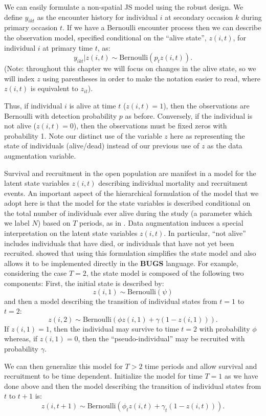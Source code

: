 We can easily formulate a non-spatial JS model using the robust
design. We define $y_{ikt}$ as the encounter history for individual
$i$ at secondary occasion $k$ during primary occasion $t$.  If we have
a Bernoulli encounter process then we can describe the observation
model, specified conditional on the ``alive state'', $z(i,t)$, for
individual $i$ at primary time $t$, as:
 \[
  y_{ikt}|z(i,t) \sim
\mbox{Bernoulli}(p_t z(i,t)).
\]
(Note: throughout this chapter we will focus on changes in the 
alive state, so we will index $z$ using parentheses in order to make the notation easier to read,
where $z(i,t)$ is equivalent to $z_{it}$).

Thus, if individual $i$ is alive at time $t$ ($z(i,t)=1$), then the
observations are Bernoulli with detection probability $p$ as before.  Conversely, if the individual is
not alive ($z(i,t)=0$), then the observations must be fixed zeros with
probability 1. Note our distinct use of the variable $z$ here as
representing the state of individuals (alive/dead) instead of our
previous use of $z$ as the data augmentation variable. 

Survival and recruitment in the open population are manifest in a
model for the latent state variables $z(i,t)$ describing individual
mortality and recruitment events.  An important aspect of the
hierarchical formulation of the model that we adopt here is that the
model for the state variables is described conditional on the total
number of individuals ever alive during the study (a parameter which
we label $N$) based on $T$ periods, as in
\citet{schwarz_arnason:1996}.  Data augmentation induces a special
interpretation on the latent state variables $z(i,t)$.  In particular,
``not alive'' includes individuals that have died, or individuals that
have not yet been recruited.  \citet{royle_dorazio:2008} showed that
using this formulation simplifies the state model and also allows it
to be implemented directly in the \textbf{BUGS} language.  For
example, considering the case $T=2$, the state model is composed of
the following two components: First, the initial state is described
by:
\[
 z(i,1) \sim \mbox{Bernoulli}(\psi)
\]
and then a model describing the transition of individual states from
$t=1$ to $t=2$:
\[
 z(i,2) \sim \mbox{Bernoulli}( \phi z(i,1)  + \gamma (1-z(i,1)) ).
\]
If $z(i,1)=1$, then the individual may survive to time $t=2$ with
probability $\phi$ whereas, if $z(i,1)=0$, then the
``pseudo-individual'' may be recruited with probability $\gamma$.

We can then generalize this model for $T>2$ time periods and allow
survival and recruitment to be time dependent.  Initialize the model
for time $T=1$ as we have done above and then the model describing the
transition of individual states from $t$ to $t+1$ is:
\[
 z(i,t+1) \sim \mbox{Bernoulli}( \phi_t z(i,t)  + \gamma_t (1-z(i,t)) ).
\]

